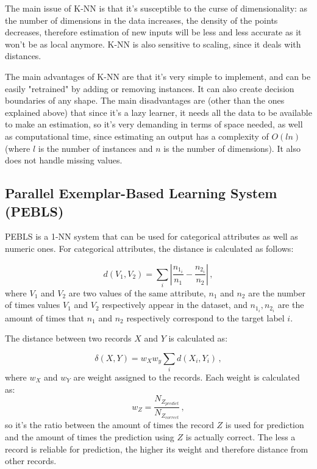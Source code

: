 The main issue of K-NN is that it's susceptible to the curse of dimensionality: as the number of dimensions in the data increases, the density of the points decreases, therefore estimation of new inputs will be less and less accurate as it won't be as local anymore. K-NN is also sensitive to scaling, since it deals with distances.

The main advantages of K-NN are that it's very simple to implement, and can be easily "retrained" by adding or removing instances. It can also create decision boundaries of any shape. The main disadvantages are (other than the ones explained above) that since it's a lazy learner, it needs all the data to be available to make an estimation, so it's very demanding in terms of space needed, as well as computational time, since estimating an output has a complexity of $O(ln)$ (where $l$ is the number of instances and $n$ is the number of dimensions). It also does not handle missing values.

\subsection{Parallel Exemplar-Based Learning System (PEBLS)}

PEBLS is a 1-NN system that can be used for categorical attributes as well as numeric ones. For categorical attributes, the distance is calculated as follows:

\begin{equation*}
    d(V_1,V_2) = \sum_i | \dfrac{n_{1_i}}{n_1} - \dfrac{n_{2_i}}{n_2} | \, ,
\end{equation*}
where $V_1$ and $V_2$ are two values of the same attribute, $n_1$ and $n_2$ are the number of times values $V_1$ and $V_2$ respectively appear in the dataset, and $n_{1_i}, n_{2_i}$ are the amount of times that $n_1$ and $n_2$ respectively correspond to the target label $i$.

The distance between two records $X$ and $Y$ is calculated as:

\begin{equation*}
    \delta (X, Y) = w_X w_y \sum_i d(X_i, Y_i) \, ,
\end{equation*}
where $w_X$ and $w_Y$ are weight assigned to the records. Each weight is calculated as:
\begin{equation*}
    w_Z = \dfrac{N_{Z_{predict}}}{N_{Z_{correct}}} \, ,
\end{equation*}
so it's the ratio between the amount of times the record $Z$ is used for prediction and the amount of times the prediction using $Z$ is actually correct. The less a record is reliable for prediction, the higher its weight and therefore distance from other records.

